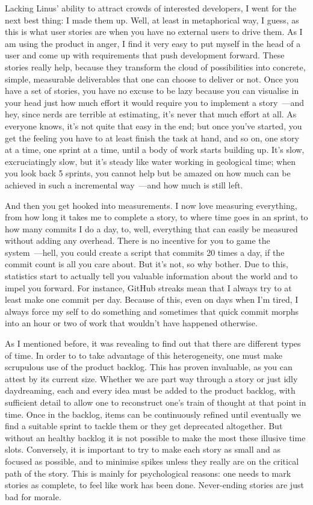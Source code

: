 \documentclass{book}
\begin{document}
Lacking Linus' ability to attract crowds of interested developers, I
went for the next best thing: I made them up. Well, at least in
metaphorical way, I guess, as this is what user stories are when you
have no external users to drive them. As I am using the product in
anger, I find it very easy to put myself in the head of a user and
come up with requirements that push development forward. These stories
really help, because they transform the cloud of possibilities into
concrete, simple, measurable deliverables that one can choose to
deliver or not. Once you have a set of stories, you have no excuse to
be lazy because you can visualise in your head just how much effort it
would require you to implement a story~---and hey, since nerds are
terrible at estimating, it's never that much effort at all. As
everyone knows, it's not quite that easy in the end; but once you've
started, you get the feeling you have to at least finish the task at
hand, and so on, one story at a time, one sprint at a time, until a
body of work starts building up. It's slow, excruciatingly slow, but
it's steady like water working in geological time; when you look back
5 sprints, you cannot help but be amazed on how much can be achieved
in such a incremental way~---and how much is still left.

And then you get hooked into measurements. I now love measuring
everything, from how long it takes me to complete a story, to where
time goes in an sprint, to how many commits I do a day, to, well,
everything that can easily be measured without adding any
overhead. There is no incentive for you to game the system~---hell, you
could create a script that commits 20 times a day, if the commit count
is all you care about. But it's not, so why bother. Due to this,
statistics start to actually tell you valuable information about the
world and to impel you forward. For instance, GitHub streaks mean that
I always try to at least make one commit per day. Because of this,
even on days when I'm tired, I always force my self to do something
and sometimes that quick commit morphs into an hour or two of work
that wouldn't have happened otherwise.

As I mentioned before, it was revealing to find out that there are
different types of time. In order to to take advantage of this
heterogeneity, one must make scrupulous use of the product
backlog. This has proven invaluable, as you can attest by its current
size. Whether we are part way through a story or just idly
daydreaming, each and every idea must be added to the product backlog,
with sufficient detail to allow one to reconstruct one's train of
thought at that point in time. Once in the backlog, items can be
continuously refined until eventually we find a suitable sprint to
tackle them or they get deprecated altogether. But without an healthy
backlog it is not possible to make the most these illusive time
slots. Conversely, it is important to try to make each story as small
and as focused as possible, and to minimise spikes unless they really
are on the critical path of the story. This is mainly for
psychological reasons: one needs to mark stories as complete, to feel
like work has been done. Never-ending stories are just bad for morale.
\end{document}
